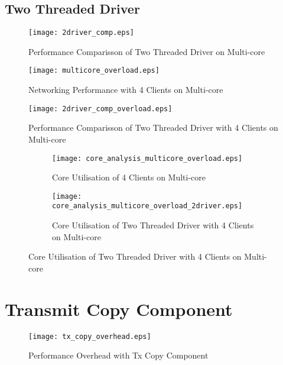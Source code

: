 \newpage

\subsection{Two Threaded Driver}

\begin{figure}[h]
    \centering
    \texttt{[image: 2driver\_comp.eps]}
    \caption{Performance Comparisson of Two Threaded Driver on Multi-core}
    \label{f:2driver_comp}
\end{figure}

\begin{figure}[h]
    \centering
    \texttt{[image: multicore\_overload.eps]}
    \caption{Networking Performance with 4 Clients on Multi-core}
    \label{f:multicore_overload}
\end{figure}

\begin{figure}[h]
    \centering
    \texttt{[image: 2driver\_comp\_overload.eps]}
    \caption{Performance Comparisson of Two Threaded Driver with 4 Clients on Multi-core}
    \label{f:2driver_comp_overload}
\end{figure}


\noindent\begin{figure}[h]
    \centering
	\begin{multicols}{2}
		\begin{subfigure}[b]{0.45\textwidth}
        \centering
        \texttt{[image: core\_analysis\_multicore\_overload.eps]}
        \caption{Core Utilisation of 4 Clients on Multi-core}
        \label{f:core_analysis_mutlicore_overload}
    \end{subfigure}\qquad
    \begin{subfigure}[b]{0.45\textwidth}
        \centering
        \texttt{[image: core\_analysis\_multicore\_overload\_2driver.eps]}
        \caption{Core Utilisation of Two Threaded Driver with 4 Clients on Multi-core}
        \label{f:core_analysis_mutlicore_overload_2driver}
    \end{subfigure}
\end{multicols}
\end{figure}


\section{Transmit Copy Component}

\begin{figure}[h]
    \centering
    \texttt{[image: tx\_copy\_overhead.eps]}
    \caption{Performance Overhead with Tx Copy Component}
    \label{f:tx_copy_overhead}
\end{figure}
